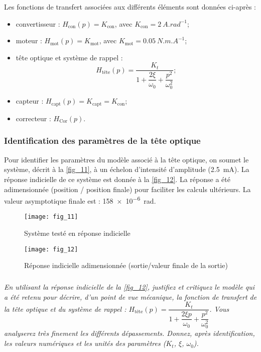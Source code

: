 Les fonctions de transfert associées aux différents éléments sont données ci-après :
\begin{multicols}{2}
\begin{itemize}
\item convertisseur : $H_{\text{con}}(p)=K_{\text{con}}$, avec $K_{\text{con}}=\SI{2}{A.rad^{-1}}$;
\item moteur : $H_{\text{mot}}(p)=K_{\text{mot}}$, avec $K_{\text{mot}}=\SI{0,05}{N.m.A^{-1}}$;
\item tête optique et système de rappel : $$H_{\text{tête}}(p)=\dfrac{K_t}{1+\dfrac{2\xi}{\omega_0}+\dfrac{p^2}{\omega_0^2}};$$
\item capteur : $H_{\text{capt}}(p)=K_{\text{capt}}=K_{\text{con}}$;
\item correcteur : $H_{\text{Cor}}(p)$.
\end{itemize}
\end{multicols}

\subsubsection{Identification des paramètres de la tête optique}
Pour identifier les paramètres du modèle associé à la tête optique, on soumet le système, décrit à la \autoref{fig_11}, à un échelon d’intensité d’amplitude (\SI{2,5}{mA}). La
réponse indicielle de ce système est donnée à la \autoref{fig_12}. La réponse a été adimensionnée (position / position
finale) pour faciliter les calculs ultérieurs. La valeur asymptotique finale est : \SI{158e-6}{rad}.


\begin{figure}[H]
\centering
\texttt{[image: fig\_11]}
\caption{\label{fig_11} Système testé en réponse indicielle}
\end{figure}


\begin{figure}[H]
\centering
\texttt{[image: fig\_12]}
\caption{\label{fig_12} Réponse indicielle adimensionnée (sortie/valeur finale de la sortie)}
\end{figure}

\subparagraph{\label{q_10}}\textit{En utilisant la réponse indicielle de la \autoref{fig_12}, justifiez et critiquez le modèle qui a été retenu pour décrire, d’un point de vue mécanique, la fonction de transfert de la tête optique et du système de rappel :
$H_{\text{tête}}(p)=\dfrac{K_t}{1+\dfrac{2\xi p}{\omega_0}+\dfrac{p^2}{\omega_0^2}}$. Vous analyserez très finement les différents dépassements. Donnez, après identification, les valeurs numériques et les unités des paramètres ($K_t$, $\xi$, $\omega_0$).}

